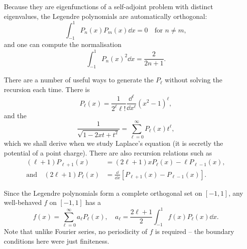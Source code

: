 \documentclass[a4paper]{scrartcl}
\begin{document}
\begin{center}
\end{center}

Because they are eigenfunctions of a self-adjoint problem with distinct eigenvalues, the Legendre polynomials are automatically orthogonal:
$$
\int_{-1}^1 P_n(x) P_m(x) \dd x = 0 \quad \text{for } n \neq m,
$$
and one can compute the normalisation
$$
\int_{-1}^1 P_n(x)^2 \dd x = \frac{2}{2n + 1}.
$$

There are a number of useful ways to generate the $P_\ell$ without solving the recursion each time. There is 
$$
P_\ell(x) = \frac{1}{2^\ell \ell!} \frac{\dd^\ell}{\dd x^\ell} (x^2 - 1)^\ell,
$$
and the 
$$
\frac{1}{\sqrt{1 - 2xt + t^2}} = \sum_{\ell = 0}^{\infty} P_\ell(x) t^\ell,
$$
which we shall derive when we study Laplace's equation (it is secretly the potential of a point charge). There are also recursion relations such as
\begin{align*}
(\ell + 1) P_{\ell + 1}(x) &= (2\ell + 1) x P_\ell(x) - \ell P_{\ell - 1}(x), \\
\text{and} \quad (2 \ell + 1) P_\ell(x) &= \frac{\dd}{\dd x}\left[P_{\ell + 1}(x) - P_{\ell - 1}(x)\right].
\end{align*}

Since the Legendre polynomials form a complete orthogonal set on $[-1, 1]$, any well-behaved $f$ on $[-1, 1]$ has a 
$$
f(x) = \sum_{\ell = 0}^{\infty} a_\ell P_\ell(x), \quad a_\ell = \frac{2 \ell + 1}{2} \int_{-1}^1 f(x) P_\ell(x) \dd x.
$$
Note that unlike Fourier series, no periodicity of $f$ is required -- the boundary conditions here were just finiteness.
\end{document}
